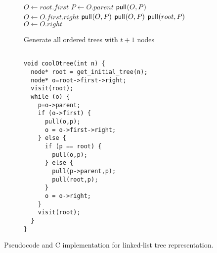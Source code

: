 \begin{figure}
    \centering
    \begin{subfigure}[t]{.49 \textwidth}
	\begin{center}
	    \begin{algorithm}[H] %
	    \begin{algorithmic}
	\State $O\gets root.first$
	\State {}
	    \State $P \gets O.parent$
		\State $\mathsf{pull}_{}(O,P)$
		\State $O \gets O.first.right$
	    \Else
		\State $\mathsf{pull}_{}(O,P)$
		\Else
		\State $\mathsf{pull}_{}(O,P)$
		\State $\mathsf{pull}_{}(root,P)$
		\EndIf
		\State $O \gets O.right$
	    \EndIf
	\State {}
        \EndWhile
    \EndFunction
	    \end{algorithmic}
    \caption*{Generate all ordered trees with $t+1$ nodes}
	\end{algorithm}
	\end{center}
	\label{fig:}
    \end{subfigure}
    \begin{subfigure}[t]{.5 \textwidth}
	\begin{center}
	    \vspace{.9em} %
\begin{Verbatim}[commandchars=\\\[\]]

void coolOtree(int n) {
  node* root = get_initial_tree(n);
  node* o=root->first->right;
  visit(root);
  while (o) {
    p=o->parent;
    if (o->first) {
      pull(o,p);
      o = o->first->right;
    } else {
      if (p == root) {
        pull(o,p);
      } else {
        pull(p->parent,p);
        pull(root,p);
      }
      o = o->right;
    }
    visit(root);
  }
}

\end{Verbatim}
	\end{center}
	\label{fig:}
    \end{subfigure}
    \cprotect\caption{Pseudocode and C implementation for linked-list tree representation.}
    \label{fig:otreeCode}
\end{figure}

